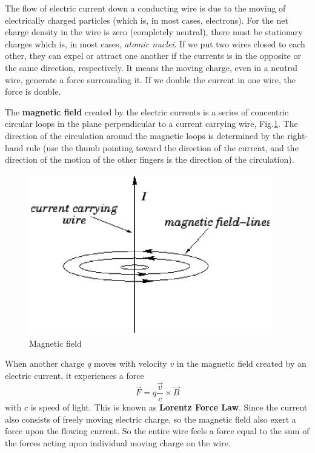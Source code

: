 The flow of electric current down a conducting wire is due to the moving of
electrically charged particles (which is, in most cases, electrons). For the net
charge density in the wire is zero (completely neutral), there must be
stationary charges which is, in most cases, {\it atomic nuclei}. If we put two
wires closed to each other, they can expel or attract one another if the
currents is in the opposite or the same direction, respectively. It means the
moving charge, even in a neutral wire, generate a force surrounding it. 
If we double the current in one wire, the force is double.

The {\bf magnetic field} created by the electric currents is a series of
concentric circular loops in the plane perpendicular to a current carrying wire,
Fig.\ref{fig:current_magnetic_field}. The direction of the circulation around
the magnetic loops is determined by the right-hand rule (use the thumb pointing
toward the direction of the current, and the direction of the motion of the
other fingers is the direction of the circulation).

\begin{figure}[hbt]
  \centerline{\includegraphics[height=7cm,
    angle=0]{./images/current_magnetic_field.eps}}
  \caption{Magnetic field}
  \label{fig:current_magnetic_field}
\end{figure}

When another charge $q$ moves with velocity $v$ in the magnetic field created by
an electric current, it experiences a force
\begin{equation}
\vec{F} = q \frac{\vec{v}}{c} \times \vec{B}
\end{equation}
with $c$ is speed of light. This is known as {\bf Lorentz Force Law}.
Since the current also consists of freely moving
electric charge, so the magnetic field also exert a force upon the flowing
current. So the entire wire feels a force equal to the sum of the forces acting
upon individual moving charge on the wire.


